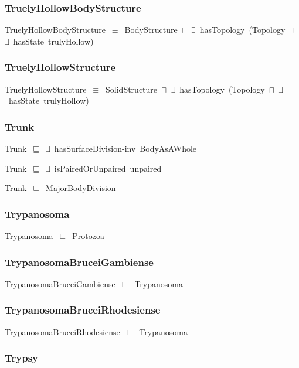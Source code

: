 \documentclass{article}
\begin{document}
\subsubsection*{TruelyHollowBodyStructure}

TruelyHollowBodyStructure~\ensuremath{\equiv}~BodyStructure~\ensuremath{\sqcap}~\ensuremath{\exists}~hasTopology~(Topology~\ensuremath{\sqcap}~\ensuremath{\exists}~hasState~trulyHollow)

\subsubsection*{TruelyHollowStructure}

TruelyHollowStructure~\ensuremath{\equiv}~SolidStructure~\ensuremath{\sqcap}~\ensuremath{\exists}~hasTopology~(Topology~\ensuremath{\sqcap}~\ensuremath{\exists}~hasState~trulyHollow)

\subsubsection*{Trunk}

Trunk~\ensuremath{\sqsubseteq}~\ensuremath{\exists}~hasSurfaceDivision-inv~BodyAsAWhole~

Trunk~\ensuremath{\sqsubseteq}~\ensuremath{\exists}~isPairedOrUnpaired~unpaired~

Trunk~\ensuremath{\sqsubseteq}~MajorBodyDivision~

\subsubsection*{Trypanosoma}

Trypanosoma~\ensuremath{\sqsubseteq}~Protozoa~

\subsubsection*{TrypanosomaBruceiGambiense}

TrypanosomaBruceiGambiense~\ensuremath{\sqsubseteq}~Trypanosoma~

\subsubsection*{TrypanosomaBruceiRhodesiense}

TrypanosomaBruceiRhodesiense~\ensuremath{\sqsubseteq}~Trypanosoma~

\subsubsection*{Trypsy}
\end{document}
